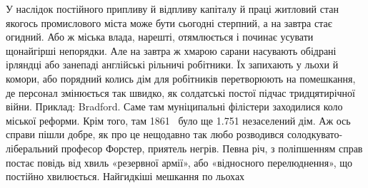 У наслідок постійного припливу й відпливу капіталу й праці
житловий стан якогось промислового міста може бути сьогодні
стерпний, а на завтра стає огидний. Або ж міська влада, нарешті,
отямлюється і починає усувати щонайгірші непорядки. Але на
завтра ж хмарою сарани насувають обідрані ірляндці або занепаді
англійські рільничі робітники. Їх запихають у льохи й
комори, або порядний колись дім для робітників перетворюють
на помешкання, де персонал змінюється так швидко, як солдатські
постої підчас тридцятирічної війни. Приклад: Bradford.
Саме там муніципальні філістери заходилися коло міської реформи.
Крім того, там 1861~ було ще \num{1.751} незаселений дім.
Аж ось справи пішли добре, як про це нещодавно так любо
розводився солодкувато-ліберальний професор Форстер, приятель
негрів. Певна річ, з поліпшенням справ постає повідь
від хвиль «резервної армії», або «відносного перелюднення»,
що постійно хвилюється. Найгидкіші мешкання по льохах
